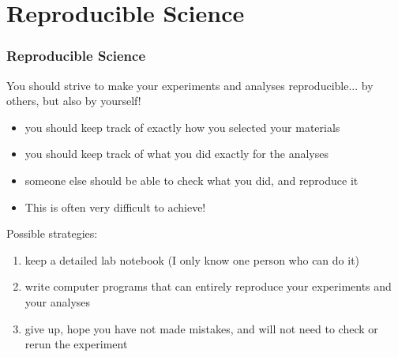 \documentclass{beamer}
\begin{document}
\section{Reproducible Science}

\begin{frame}
\frametitle{Reproducible Science}

You should strive to make your experiments and analyses reproducible... 
by others, but also by yourself!

\pause

{ \fontsize{9pt}{11}\selectfont

\begin{itemize}
\item you should keep track of exactly how you selected your materials
\item you should keep track of what you did exactly for the analyses
\item someone else should be able to check what you did, and reproduce it
\item This is often very difficult to achieve!
\end{itemize} }

\pause
Possible strategies:

{ \fontsize{9pt}{11}\selectfont


\begin{enumerate}
\item keep a detailed lab notebook (I only know one person who can do it) 
\item write computer programs that can entirely reproduce your experiments and your analyses
\item give up,  hope you have not made mistakes, and will not need to check or rerun the experiment
\end{enumerate}
}

\end{frame}
\end{document}
